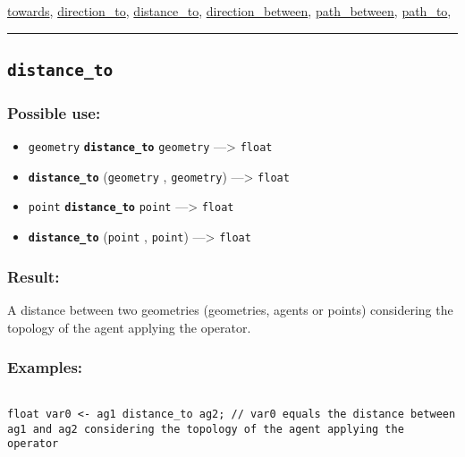 \documentclass[]{book}
\providecommand{\tightlist}{%
  \setlength{\itemsep}{0pt}\setlength{\parskip}{0pt}}
\theoremstyle{definition}
\theoremstyle{definition}
\theoremstyle{definition}
\theoremstyle{remark}
\begin{document}
\href{OperatorsSZ\#towards}{towards},
\href{OperatorsDH\#direction_to}{direction\_to},
\href{OperatorsDH\#distance_to}{distance\_to},
\href{OperatorsDH\#direction_between}{direction\_between},
\href{OperatorsNR\#path_between}{path\_between},
\href{OperatorsNR\#path_to}{path\_to},

\begin{center}\rule{0.5\linewidth}{\linethickness}\end{center}

\subsection{\texorpdfstring{\texttt{distance\_to}}{distance\_to}}\label{distance_to}

\subsubsection{Possible use:}\label{possible-use-136}

\begin{itemize}
\tightlist
\item
  \texttt{geometry} \textbf{\texttt{distance\_to}} \texttt{geometry}
  ---\textgreater{} \texttt{float}
\item
  \textbf{\texttt{distance\_to}} (\texttt{geometry} , \texttt{geometry})
  ---\textgreater{} \texttt{float}
\item
  \texttt{point} \textbf{\texttt{distance\_to}} \texttt{point}
  ---\textgreater{} \texttt{float}
\item
  \textbf{\texttt{distance\_to}} (\texttt{point} , \texttt{point})
  ---\textgreater{} \texttt{float}
\end{itemize}

\subsubsection{Result:}\label{result-132}

A distance between two geometries (geometries, agents or points)
considering the topology of the agent applying the operator.

\subsubsection{Examples:}\label{examples-103}

\begin{verbatim}
 
float var0 <- ag1 distance_to ag2; // var0 equals the distance between ag1 and ag2 considering the topology of the agent applying the operator
\end{verbatim}
\end{document}
